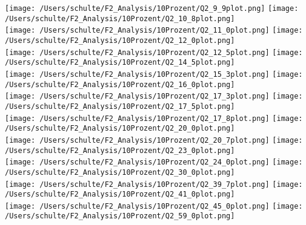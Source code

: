 \texttt{[image: /Users/schulte/F2\_Analysis/10Prozent/Q2\_9\_9plot.png]}
\texttt{[image: /Users/schulte/F2\_Analysis/10Prozent/Q2\_10\_8plot.png]}\\

\texttt{[image: /Users/schulte/F2\_Analysis/10Prozent/Q2\_11\_0plot.png]}
\texttt{[image: /Users/schulte/F2\_Analysis/10Prozent/Q2\_12\_0plot.png]}\\
\texttt{[image: /Users/schulte/F2\_Analysis/10Prozent/Q2\_12\_5plot.png]}
\texttt{[image: /Users/schulte/F2\_Analysis/10Prozent/Q2\_14\_5plot.png]}\\

\texttt{[image: /Users/schulte/F2\_Analysis/10Prozent/Q2\_15\_3plot.png]}
\texttt{[image: /Users/schulte/F2\_Analysis/10Prozent/Q2\_16\_0plot.png]}\\

\texttt{[image: /Users/schulte/F2\_Analysis/10Prozent/Q2\_17\_3plot.png]}
\texttt{[image: /Users/schulte/F2\_Analysis/10Prozent/Q2\_17\_5plot.png]}\\

\texttt{[image: /Users/schulte/F2\_Analysis/10Prozent/Q2\_17\_8plot.png]}
\texttt{[image: /Users/schulte/F2\_Analysis/10Prozent/Q2\_20\_0plot.png]}\\

\texttt{[image: /Users/schulte/F2\_Analysis/10Prozent/Q2\_20\_7plot.png]}
\texttt{[image: /Users/schulte/F2\_Analysis/10Prozent/Q2\_23\_0plot.png]}\\

\texttt{[image: /Users/schulte/F2\_Analysis/10Prozent/Q2\_24\_0plot.png]}
\texttt{[image: /Users/schulte/F2\_Analysis/10Prozent/Q2\_30\_0plot.png]}\\

\texttt{[image: /Users/schulte/F2\_Analysis/10Prozent/Q2\_39\_7plot.png]}
\texttt{[image: /Users/schulte/F2\_Analysis/10Prozent/Q2\_41\_0plot.png]}\\

\texttt{[image: /Users/schulte/F2\_Analysis/10Prozent/Q2\_45\_0plot.png]}
\texttt{[image: /Users/schulte/F2\_Analysis/10Prozent/Q2\_59\_0plot.png]}\\

